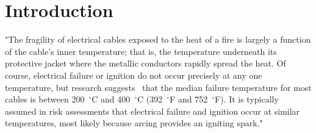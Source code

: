 \pagestyle{fancy}
\renewcommand{\headrulewidth}{0pt}
  \fancyhead{}
  \fancyhead[l]{\small \pubnumber \\
	\small \pubmonth~\pubyear \\}
\section{Introduction}





"The fragility of electrical cables exposed to the heat of a fire is largely a function of the cable's inner temperature; that is, the temperature underneath its protective jacket where the metallic conductors rapidly spread the heat. Of course, electrical failure or ignition do not occur precisely at any one temperature, but research suggests~\cite{CAROLFIRE} that the median failure temperature for most cables is between 200~$^\circ$C and 400~$^\circ$C (392~$^\circ$F and 752~$^\circ$F). It is typically assumed in risk assessments that electrical failure and ignition occur at similar temperatures, most likely because arcing provides an igniting spark."

